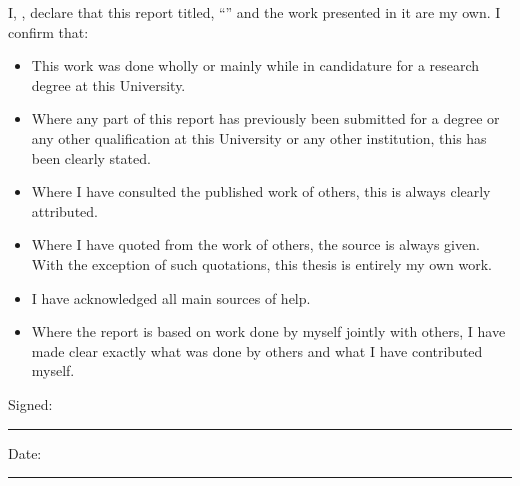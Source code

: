 \documentclass[
11pt, %
english, %
singlespacing, %
headsepline, %
]{MastersDoctoralThesis} %
\begin{document}

\begin{declaration}
\addchaptertocentry{\authorshipname} %

\noindent I, \authorname, declare that this report titled, \enquote{\ttitle} and the work presented in it are my own. I confirm that:

\begin{itemize}
\item This work was done wholly or mainly while in candidature for a research degree at this University.
\item Where any part of this report has previously been submitted for a degree or any other qualification at this University or any other institution, this has been clearly stated.
\item Where I have consulted the published work of others, this is always clearly attributed.
\item Where I have quoted from the work of others, the source is always given. With the exception of such quotations, this thesis is entirely my own work.
\item I have acknowledged all main sources of help.
\item Where the report is based on work done by myself jointly with others, I have made clear exactly what was done by others and what I have contributed myself.
\end{itemize}

\noindent Signed:\\
\rule[0.5em]{25em}{0.5pt} %

\noindent Date:\\
\rule[0.5em]{25em}{0.5pt} %
\end{declaration}



\begin{abstract}
\addchaptertocentry{\abstractname} %

\end{abstract}

\cleardoublepage
\end{document}
